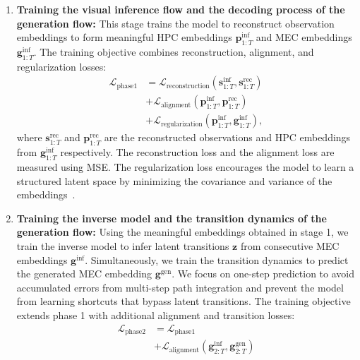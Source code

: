 \begin{enumerate}
     \item \textbf{Training the visual inference flow and the decoding process of the generation flow:} This stage trains the model to reconstruct observation embeddings to form meaningful HPC embeddings $\boldsymbol{p}_{1:T}^{\text{inf}}$ and MEC embeddings $\boldsymbol{g}_{1:T}^{\text{inf}}$. The training objective combines reconstruction, alignment, and regularization losses:
    \begin{equation}
    \begin{aligned}
        \mathcal{L}_{\text{phase1}} & = \mathcal{L}_{\text{reconstruction}}(\boldsymbol{s}_{1:T}^{\text{inf}}, \boldsymbol{s}_{1:T}^{\text{rec}}) \\
        & + \mathcal{L}_{\text{alignment}}(\boldsymbol{p}_{1:T}^{\text{inf}}, \boldsymbol{p}_{1:T}^{\text{rec}}) \\
        & + \mathcal{L}_{\text{regularization}}(\boldsymbol{p}_{1:T}^{\text{inf}}, \boldsymbol{g}_{1:T}^{\text{inf}}),
    \end{aligned}
    \end{equation}
    where $\boldsymbol{s}_{1:T}^{\text{rec}}$ and $\boldsymbol{p}_{1:T}^{\text{rec}}$ are the reconstructed observations and HPC embeddings from $\boldsymbol{g}_{1:T}^{\text{inf}}$ respectively. The reconstruction loss and the alignment loss are measured using MSE. The regularization loss encourages the model to learn a structured latent space by minimizing the covariance and variance of the embeddings~\citep{bardes2022vicreg}.
    \item \textbf{Training the inverse model and the transition dynamics of the generation flow:} Using the meaningful embeddings obtained in stage 1, we train the inverse model to infer latent transitions $\boldsymbol{z}$ from consecutive MEC embeddings $\boldsymbol{g}^{\text{inf}}$. Simultaneously, we train the transition dynamics to predict the generated MEC embedding $\boldsymbol{g}^{\text{gen}}$. We focus on one-step prediction to avoid accumulated errors from multi-step path integration and prevent the model from learning shortcuts that bypass latent transitions. The training objective extends phase 1 with additional alignment and transition losses:
    \begin{equation}
    \begin{aligned}
        \mathcal{L}_{\text{phase2}} & = \mathcal{L}_{\text{phase1}} \\
        & + \mathcal{L}_{\text{alignment}}(\boldsymbol{g}_{2:T}^{\text{inf}}, \boldsymbol{g}_{2:T}^{\text{gen}}) \\

\end{aligned}
\end{equation}
\end{enumerate}
